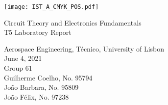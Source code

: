 
\thispagestyle {empty}

\texttt{[image: IST\_A\_CMYK\_POS.pdf]}

\begin{center}
%
\vspace{1.0cm}

\vspace{1cm}
{\FontLb Circuit Theory and Electronics Fundamentals} \\ %
\vspace{3cm}
{\FontSn T5 Laboratory Report} %
\vspace{3cm}
\par
{\FontSn Aerospace Engineering, Técnico, University of Lisbon} \\
\vspace{1cm}
{\FontSn June 4, 2021}\\ %
%
\vspace{1.5cm}
{\FontLb Group 61} \\
\vspace{1cm}
{\FontSn Guilherme Coelho, No. 95794} \\
{\FontSn João Barbara, No. 95809} \\
{\FontSn João Félix, No. 97238} \\
\end{center}
